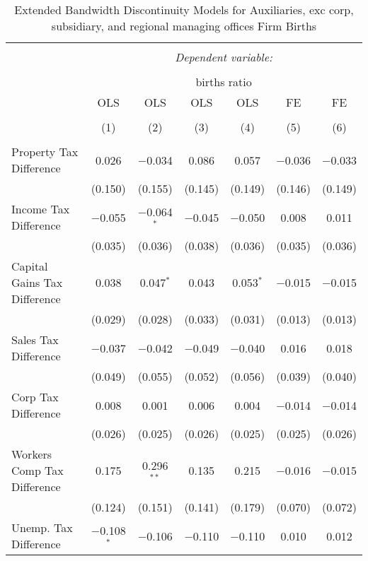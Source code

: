 
\begin{table}[!htbp] \centering 
  \caption{Extended Bandwidth Discontinuity Models for  Auxiliaries, exc corp, subsidiary, and regional managing offices Firm Births} 
  \label{95eb} 
\begin{tabular}{@{\extracolsep{5pt}}lcccccc} 
\\[-1.8ex]\hline 
\hline \\[-1.8ex] 
 & \multicolumn{6}{c}{\textit{Dependent variable:}} \\ 
\cline{2-7} 
\\[-1.8ex] & \multicolumn{6}{c}{births ratio} \\ 
 & OLS & OLS & OLS & OLS & FE & FE \\ 
\\[-1.8ex] & (1) & (2) & (3) & (4) & (5) & (6)\\ 
\hline \\[-1.8ex] 
 Property Tax Difference & 0.026 & $-$0.034 & 0.086 & 0.057 & $-$0.036 & $-$0.033 \\ 
  & (0.150) & (0.155) & (0.145) & (0.149) & (0.146) & (0.149) \\ 
  Income Tax Difference & $-$0.055 & $-$0.064$^{*}$ & $-$0.045 & $-$0.050 & 0.008 & 0.011 \\ 
  & (0.035) & (0.036) & (0.038) & (0.036) & (0.035) & (0.036) \\ 
  Capital Gains Tax Difference & 0.038 & 0.047$^{*}$ & 0.043 & 0.053$^{*}$ & $-$0.015 & $-$0.015 \\ 
  & (0.029) & (0.028) & (0.033) & (0.031) & (0.013) & (0.013) \\ 
  Sales Tax Difference & $-$0.037 & $-$0.042 & $-$0.049 & $-$0.040 & 0.016 & 0.018 \\ 
  & (0.049) & (0.055) & (0.052) & (0.056) & (0.039) & (0.040) \\ 
  Corp Tax Difference & 0.008 & 0.001 & 0.006 & 0.004 & $-$0.014 & $-$0.014 \\ 
  & (0.026) & (0.025) & (0.026) & (0.025) & (0.025) & (0.026) \\ 
  Workers Comp Tax Difference & 0.175 & 0.296$^{**}$ & 0.135 & 0.215 & $-$0.016 & $-$0.015 \\ 
  & (0.124) & (0.151) & (0.141) & (0.179) & (0.070) & (0.072) \\ 
  Unemp. Tax Difference & $-$0.108$^{*}$ & $-$0.106 & $-$0.110 & $-$0.110 & 0.010 & 0.012 \\ 

\end{tabular}
\end{table}
